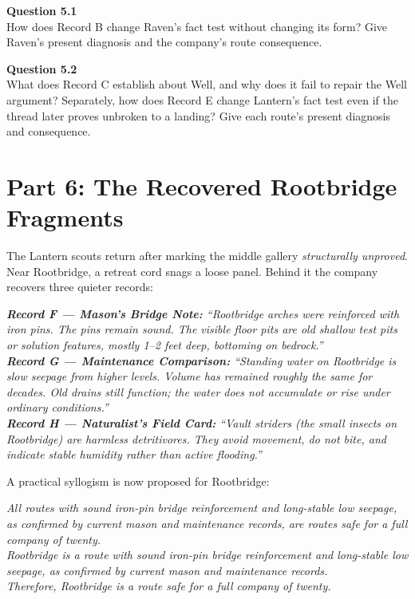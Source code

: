 \documentclass[12pt]{article}
\newcommand{\cluebox}[1]{\par\vspace{0.12em}\noindent\begin{minipage}{\textwidth}\itshape #1\end{minipage}\par\vspace{0.12em}}
\begin{document}
\textbf{Question 5.1}\\[-0.15em]
How does Record B change Raven's fact test without changing its form? Give Raven's present diagnosis and the company's route consequence.

\textbf{Question 5.2}\\[-0.15em]
What does Record C establish about Well, and why does it fail to repair the Well argument? Separately, how does Record E change Lantern's fact test even if the thread later proves unbroken to a landing? Give each route's present diagnosis and consequence.

\newpage
\section*{Part 6: The Recovered Rootbridge Fragments}
The Lantern scouts return after marking the middle gallery \emph{structurally unproved}. Near Rootbridge, a retreat cord snags a loose panel. Behind it the company recovers three quieter records:

\cluebox{\textbf{Record F --- Mason's Bridge Note:} ``Rootbridge arches were reinforced with iron pins. The pins remain sound. The visible floor pits are old shallow test pits or solution features, mostly 1--2 feet deep, bottoming on bedrock.''\\[0.2em]
\textbf{Record G --- Maintenance Comparison:} ``Standing water on Rootbridge is slow seepage from higher levels. Volume has remained roughly the same for decades. Old drains still function; the water does not accumulate or rise under ordinary conditions.''\\[0.2em]
\textbf{Record H --- Naturalist's Field Card:} ``Vault striders (the small insects on Rootbridge) are harmless detritivores. They avoid movement, do not bite, and indicate stable humidity rather than active flooding.''}

A practical syllogism is now proposed for Rootbridge:

\cluebox{All routes with sound iron-pin bridge reinforcement and long-stable low seepage, as confirmed by current mason and maintenance records, are routes safe for a full company of twenty.\\
Rootbridge is a route with sound iron-pin bridge reinforcement and long-stable low seepage, as confirmed by current mason and maintenance records.\\
Therefore, Rootbridge is a route safe for a full company of twenty.}
\end{document}
